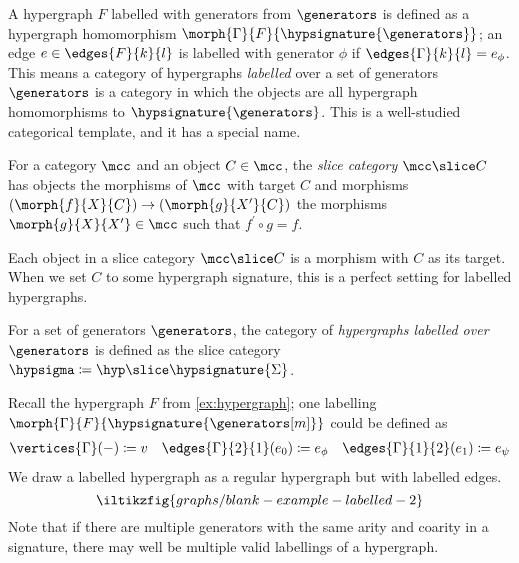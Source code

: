 A hypergraph \(F\) labelled with generators from \(\generators\) is defined
as a hypergraph homomorphism \(\morph{\Gamma}{F}{\hypsignature{\generators}}\);
an edge \(e \in \edges{F}{k}{l}\) is labelled with generator
\(\phi\) if \(\edges{\Gamma}{k}{l} = e_\phi\).
This means a category of hypergraphs \emph{labelled} over a set of generators
\(\generators\) is a category in which the objects are all hypergraph
homomorphisms to \(\hypsignature{\generators}\).
This is a well-studied categorical template, and it has a special name.

\begin{definition}\label{def:slice-category}
    For a category \(\mcc\) and an object \(C \in \mcc\), the
    \emph{slice category} \(\mcc \slice C\) has objects the morphisms of
    \(\mcc\) with target \(C\) and morphisms
    \((\morph{f}{X}{C}) \to (\morph{g}{X^\prime}{C})\) the morphisms
    \(\morph{g}{X}{X^\prime} \in \mcc\) such that \(f^\prime\circ g = f\).
\end{definition}

Each object in a slice category \(\mcc \slice C\) is a morphism with \(C\) as
its target.
When we set \(C\) to some hypergraph signature, this is a perfect setting for
labelled hypergraphs.

\begin{definition}
    For a set of generators \(\generators\), the category of
    \emph{hypergraphs labelled over \(\generators\)} is defined as the slice
    category
    \(\hypsigma \coloneqq \hyp \slice \hypsignature{\Sigma}\).
\end{definition}

\begin{example}\label{ex:labelled-hypergraph}
    Recall the hypergraph \(F\) from \cref{ex:hypergraph}; one labelling
    \(\morph{\Gamma}{F}{\hypsignature{\generators[m]}}\) could be defined as
    \begin{gather*}
        \vertices{\Gamma}(-) \coloneqq v
        \quad
        \edges{\Gamma}{2}{1}(e_0) \coloneqq e_\phi
        \quad
        \edges{\Gamma}{1}{2}(e_1) \coloneqq e_\psi
    \end{gather*}
    We draw a labelled hypergraph as a regular hypergraph but with labelled
    edges.
    \[
        \iltikzfig{graphs/blank-example-labelled-2}
    \]
    Note that if there are multiple generators with the same arity and coarity
    in a signature, there may well be multiple valid labellings of a hypergraph.
\end{example}

